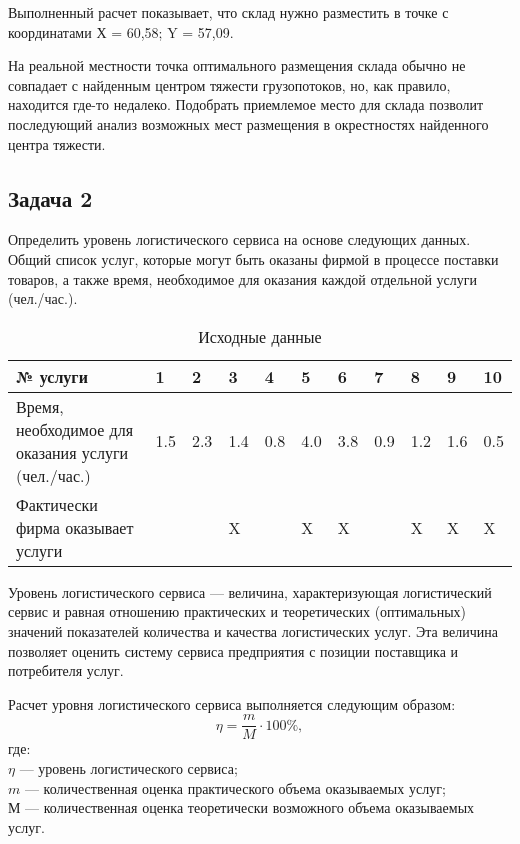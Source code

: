 Выполненный расчет показывает, что склад нужно разместить в точке с координатами Х = 60,58; Y = 57,09.

На реальной местности точка оптимального размещения склада обычно не совпадает с найденным центром тяжести грузопотоков, но, как правило, находится где-то недалеко.
Подобрать приемлемое место для склада позволит последующий анализ возможных мест размещения в окрестностях найденного центра тяжести.

\subsection*{Задача 2}
Определить уровень логистического сервиса на основе следующих данных.
Общий список услуг, которые могут быть оказаны фирмой в процессе поставки товаров, а также время, необходимое для оказания каждой отдельной услуги (чел./час.).

\begin{table}[]
	\small
	\centering
	\caption{Исходные данные}
	\label{my-label}
	\setlength{\extrarowheight}{1mm}
	\begin{tabularx}{\textwidth}{|p{4.2cm}|K{0.8cm}|K{0.8cm}|K{0.8cm}|K{0.8cm}|K{0.8cm}|K{0.8cm}|K{0.8cm}|K{0.8cm}|K{0.8cm}|K{0.8cm}|}
		\hline
		№ услуги                                           & 1   & 2   & 3   & 4   & 5   & 6   & 7   & 8   & 9   & 10  \\ \hline
		Время, необходимое для оказания услуги (чел./час.) & 1.5 & 2.3 & 1.4 & 0.8 & 4.0 & 3.8 & 0.9 & 1.2 & 1.6 & 0.5 \\ \hline
		Фактически фирма оказывает услуги&&&X&&X&X&&X&X&X \\ \hline
	\end{tabularx}
\end{table}

Уровень логистического сервиса --- величина, характеризующая логистический сервис и равная отношению практических и теоретических (оптимальных) значений показателей количества и качества логистических услуг.
Эта величина позволяет оценить систему сервиса предприятия с позиции поставщика и потребителя услуг.

Расчет уровня логистического сервиса выполняется следующим образом:
\[ \eta = \dfrac{m}{M} \cdot 100\%, \]
где:\\
$\eta$ --- уровень логистического сервиса;\\
$m$ --- количественная оценка практического объема оказываемых услуг;\\
$М$ --- количественная оценка теоретически возможного объема оказываемых услуг.

